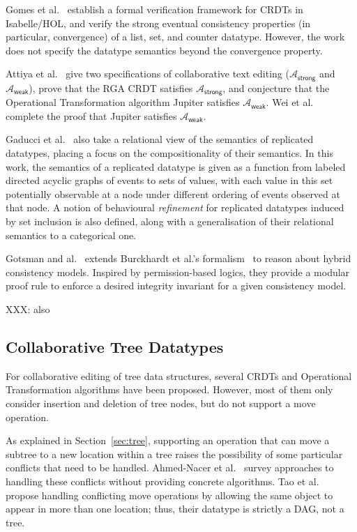 Gomes et al.~\cite{Gomes:2017gy} establish a formal verification framework for CRDTs in Isabelle/HOL, and verify the strong eventual consistency properties (in particular, convergence) of a list, set, and counter datatype.
However, the work does not specify the datatype semantics beyond the convergence property.

Attiya et al.~\cite{Attiya:2016kh} give two specifications of collaborative text editing ($\mathcal{A}_\textsf{strong}$ and $\mathcal{A}_\textsf{weak}$), prove that the RGA CRDT \cite{Roh:2011dw} satisfies $\mathcal{A}_\textsf{strong}$, and conjecture that the Operational Transformation algorithm Jupiter \cite{Nichols:1995fd} satisfies $\mathcal{A}_\textsf{weak}$.
Wei et al.~\cite{Wei:2017tg} complete the proof that Jupiter satisfies $\mathcal{A}_\textsf{weak}$.

Gaducci et al.~\cite{DBLP:conf/coordination/GadducciMR17} also take a relational view of the semantics of replicated datatypes, placing a focus on the compositionality of their semantics.
In this work, the semantics of a replicated datatype is given as a function from labeled directed acyclic graphs of events to sets of values, with each value in this set potentially observable at a node under different ordering of events observed at that node.
A notion of behavioural \emph{refinement} for replicated datatypes induced by set inclusion is also defined, along with a generalisation of their relational semantics to a categorical one.

Gotsman and al.~\cite{DBLP:conf/popl/GotsmanYFNS16} extends Burckhardt et al.'s
formalism~\cite{Burckhardt:2014ft} to reason about hybrid consistency models.
Inspired by permission-based logics, they provide a modular proof rule
to enforce a desired integrity invariant for a given consistency model.

XXX: also~\cite{DBLP:conf/atva/MukundRS15}

\subsection{Collaborative Tree Datatypes}

For collaborative editing of tree data structures, several CRDTs \cite{Martin:2010ih,Kleppmann:2016ve} and Operational Transformation algorithms \cite{Jungnickel:2016cb,Ignat:2003jy,Davis:2002iv} have been proposed.
However, most of them only consider insertion and deletion of tree nodes, but do not support a move operation.

As explained in Section~\ref{sec:tree}, supporting an operation that can move a subtree to a new location within a tree raises the possibility of some particular conflicts that need to be handled.
Ahmed-Nacer et al.~\cite{AhmedNacer:2012us} survey approaches to handling these conflicts without providing concrete algorithms.
Tao et al.~\cite{Tao:2015gd} propose handling conflicting move operations by allowing the same object to appear in more than one location; thus, their datatype is strictly a DAG, not a tree.


